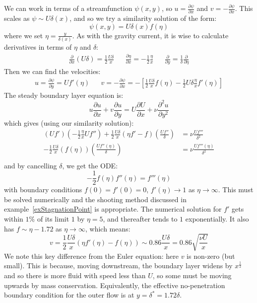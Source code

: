 \documentclass[../Main.tex]{subfiles}
\begin{document}
We can work in terms of a streamfunction $\psi(x, y)$, so $u = \frac{\partial \psi}{\partial x}$ and $v = -\frac{\partial\psi}{\partial x}$. This scales as $\psi \sim U\delta(x)$, and so we try a similarity solution of the form:
\begin{equation*}
    \psi(x, y) = U \delta(x) f(\eta)
\end{equation*}
where we set $\eta = \frac{y}{\delta(x)}$. As with the gravity current, it is wise to calculate derivatives in terms of $\eta$ and $\delta$:
\begin{align*}
    \frac{\partial }{\partial x} (U\delta) = \frac12 \frac{U\delta}{x} && \frac{\partial \eta}{\partial x} = -\frac12 \frac{\eta}{x} && \frac{\partial }{\partial y} = \frac1\delta \frac{\partial }{\partial \eta}
\end{align*}
Then we can find the velocities:
\begin{align*}
    u = \frac{\partial \psi}{\partial y} = U f'(\eta) && v = -\frac{\partial \psi}{\partial x} = -\left[\frac12 \frac{U\delta}{x} f(\eta) -\frac12 U\delta \frac{\eta}{x} f'(\eta)\right]
\end{align*}
The steady boundary layer equation is:
\begin{equation*}
    u \frac{\partial u}{\partial x} + v \frac{\partial u}{\partial y} = U \frac{\partial U}{\partial x} + \nu \frac{\partial^{2}u}{\partial y^{2}}
\end{equation*}
which gives (using our similarity solution):
\begin{align*}
    \left(U f'\right)\left(-\frac12 \frac{\eta}{x}U f''\right) + \frac12 \frac{U\delta}{x} \left(\eta f' - f\right) \left(\frac{Uf''}{\delta}\right) &= \nu \frac{Uf'''}{\delta^2} \\
    -\frac12 \frac{U\delta}{x} \left(f(\eta)\right) \left(\frac{Uf''(\eta)}{\delta}\right) &= \nu \frac{Uf'''(\eta)}{\delta^2} \\
\end{align*}
and by cancelling $\delta$, we get the ODE:
\begin{equation*}
    -\frac12 f(\eta) f''(\eta) = f'''(\eta)
\end{equation*}
with boundary conditions $f(0) = f'(0) = 0$, $f'(\eta) \to 1$ as $\eta \to\infty$. This must be solved numerically and the shooting method discussed in example~\ref{exStagnationPoint} is appropriate. The numerical solution for $f'$ gets within $1\%$ of its limit $1$ by $\eta = 5$, and thereafter tends to $1$ exponentially. It also has $f \sim \eta - 1.72$ as $\eta \to \infty$, which means:
\begin{equation*}
    v = \frac12 \frac{U\delta}{x}(\eta f'(\eta) - f(\eta)) \sim 0.86 \frac{U\delta}{x} = 0.86 \sqrt{\frac{\nu U}{x}}
\end{equation*}
We note this key difference from the Euler equation: here $v$ is non-zero (but small). This is because, moving downstream, the boundary layer widens by $x^{\frac12}$ and so there is more fluid with speed less than $U$, so some must be moving upwards by mass conservation. Equivalently, the effective no-penetration boundary condition for the outer flow is at $y = \delta^* = 1.72\delta$.
\end{document}
